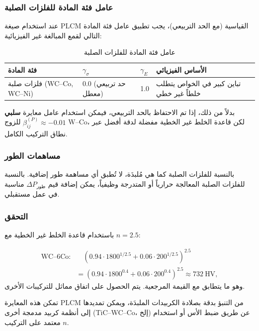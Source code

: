 \documentclass[12pt,a4paper]{article}
\begin{document}
	\subsubsection{عامل فئة المادة للفلزات الصلبة}
	عند استخدام صيغة PLCM القياسية (مع الحد التربيعي)، يجب تطبيق عامل فئة المادة التالي لقمع المبالغة غير الفيزيائية:
	
	\begin{longtable}{p{3.5cm} p{2.5cm} p{2.5cm} p{5cm}}
		\caption{عامل فئة المادة للفلزات الصلبة}\\
		\toprule
		\textbf{فئة المادة} & \(\gamma_{\sigma}\) & \(\gamma_{E}\) & \textbf{الأساس الفيزيائي} \\
		\midrule
		فلزات صلبة (WC–Co, WC–Ni) & 0.0 (حد تربيعي معطل) & 1.0 & تباين كبير في الخواص يتطلب خلطاً غير خطي \\
		\bottomrule
	\end{longtable}
	
	بدلاً من ذلك، إذا تم الاحتفاظ بالحد التربيعي، فيمكن استخدام عامل معايرة \textbf{سلبي} \(\beta_{ij}^{(P)} \approx -0.01\) للزوج W–Co، لكن قاعدة الخلط غير الخطية مفضلة لدقة أفضل عبر نطاق التركيب الكامل.
	
	\subsubsection{مساهمات الطور}
	بالنسبة للفلزات الصلبة كما هي مُلبدَة، لا تُطبق أي مساهمة طور إضافية. بالنسبة للفلزات الصلبة المعالجة حرارياً أو المتدرجة وظيفياً، يمكن إضافة قيم \(\Delta P_{\text{طور}}\) مناسبة في عمل مستقبلي.
	
	\subsubsection{التحقق}
	باستخدام قاعدة الخلط غير الخطية مع \(n=2.5\):
	
	\[
	\begin{aligned}
		\text{WC–6Co:}&\quad (0.94\cdot1800^{1/2.5} + 0.06\cdot200^{1/2.5})^{2.5} \\
		&= (0.94\cdot1800^{0.4} + 0.06\cdot200^{0.4})^{2.5} \approx 732\ \text{HV},
	\end{aligned}
	\]
	وهو ما يتطابق مع القيمة المرجعية. يتم الحصول على اتفاق مماثل للتركيبات الأخرى.
	
	تمكن هذه المعايرة PLCM من التنبؤ بدقة بصلادة الكربيدات الملبدَة، ويمكن تمديدها إلى أنظمة كربيد مدمجة أخرى (TiC–WC–Co، إلخ) عن طريق ضبط الأس أو استخدام \(n\) معتمد على التركيب.
	
	
\end{document}
